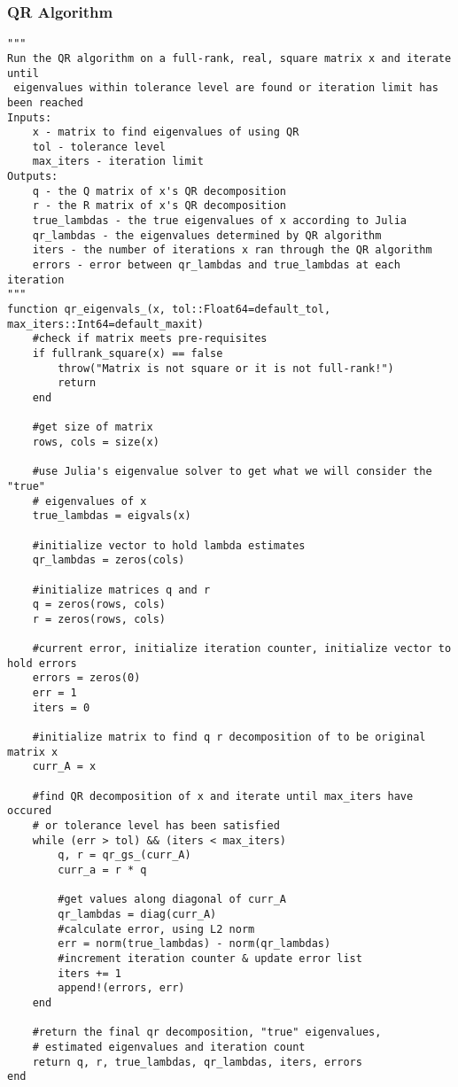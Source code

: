 \documentclass[onecolumn]{webofc}
\begin{document}
\subsubsection*{QR Algorithm}
\begin{lstlisting}
"""
Run the QR algorithm on a full-rank, real, square matrix x and iterate until
 eigenvalues within tolerance level are found or iteration limit has been reached
Inputs:
    x - matrix to find eigenvalues of using QR
    tol - tolerance level
    max_iters - iteration limit
Outputs:
    q - the Q matrix of x's QR decomposition
    r - the R matrix of x's QR decomposition
    true_lambdas - the true eigenvalues of x according to Julia
    qr_lambdas - the eigenvalues determined by QR algorithm
    iters - the number of iterations x ran through the QR algorithm
    errors - error between qr_lambdas and true_lambdas at each iteration
"""
function qr_eigenvals_(x, tol::Float64=default_tol, max_iters::Int64=default_maxit)
    #check if matrix meets pre-requisites
    if fullrank_square(x) == false
        throw("Matrix is not square or it is not full-rank!")
        return
    end

    #get size of matrix
    rows, cols = size(x)
    
    #use Julia's eigenvalue solver to get what we will consider the "true"
    # eigenvalues of x
    true_lambdas = eigvals(x)

    #initialize vector to hold lambda estimates
    qr_lambdas = zeros(cols)

    #initialize matrices q and r
    q = zeros(rows, cols)
    r = zeros(rows, cols)

    #current error, initialize iteration counter, initialize vector to hold errors
    errors = zeros(0)
    err = 1
    iters = 0

    #initialize matrix to find q r decomposition of to be original matrix x
    curr_A = x

    #find QR decomposition of x and iterate until max_iters have occured
    # or tolerance level has been satisfied
    while (err > tol) && (iters < max_iters)
        q, r = qr_gs_(curr_A)
        curr_a = r * q

        #get values along diagonal of curr_A
        qr_lambdas = diag(curr_A)
        #calculate error, using L2 norm
        err = norm(true_lambdas) - norm(qr_lambdas)
        #increment iteration counter & update error list
        iters += 1
        append!(errors, err)
    end

    #return the final qr decomposition, "true" eigenvalues, 
    # estimated eigenvalues and iteration count
    return q, r, true_lambdas, qr_lambdas, iters, errors
end
\end{lstlisting}
\end{document}
